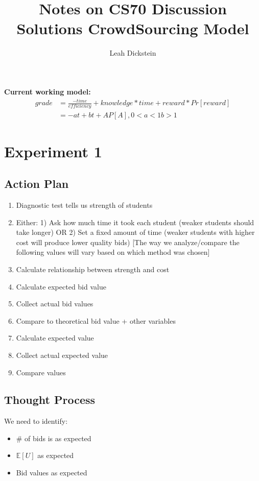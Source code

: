 \documentclass[leqno]{article}
\begin{document}
\title{Notes on CS70 Discussion Solutions CrowdSourcing Model}
\author{Leah Dickstein}

\maketitle

\textbf{Current working model:} 
\begin{align*}
grade &= \frac{-time}{efficiency} + knowledge*time + reward * Pr[reward]\\
&= -at + bt + AP[A], 0<a<1 b>1
\end{align*}

\tableofcontents

\section{Experiment 1}
\subsection{Action Plan}
\begin{enumerate}
\item Diagnostic test tells us strength of students
\item Either: 1) Ask how much time it took each student (weaker students should take longer) OR 2) Set a fixed amount of time (weaker students with higher cost will produce lower quality bids) [The way we analyze/compare the following values will vary based on which method was chosen]
\item Calculate relationship between strength and cost
\item Calculate expected bid value
\item Collect actual bid values
\item Compare to theoretical bid value + other variables
\item Calculate expected value
\item Collect actual expected value
\item Compare values
\end{enumerate}

\subsection{Thought Process}
We need to identify:
\begin{itemize}
\item \# of bids is as expected
\item $\mathbb{E} [U]$ as expected
\item Bid values as expected
\end{itemize}
\end{document}
